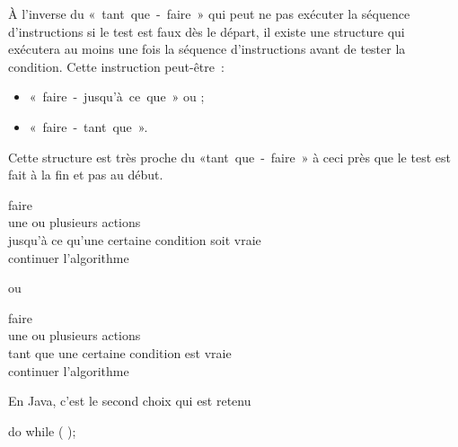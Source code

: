 	À l'inverse du «~tant~que~-~faire~» qui peut ne pas exécuter la séquence
	d'instructions si le test est faux dès le départ, il existe une structure
	qui exécutera au moins une fois la séquence d'instructions avant de tester
	la condition. Cette instruction peut-être~:

	\begin{itemize}
		\item «~faire~-~jusqu'à~ce~que~» ou ;
		\item «~faire~-~tant~que~».
	\end{itemize}
	
	Cette structure est très proche du «tant~que~-~faire~» à ceci près que le
	test est fait à la fin et pas au début.
 
	\begin{langagenaturel}
		faire\\
			\tab une ou plusieurs actions\\
		jusqu'à ce qu'une certaine condition soit vraie\\
		continuer l'algorithme 
	\end{langagenaturel}
	
	ou
	
	\begin{langagenaturel}
		faire\\
			\tab une ou plusieurs actions\\
		tant que une certaine condition est vraie\\
		continuer l'algorithme 
	\end{langagenaturel}
	
	En Java, c'est le second choix qui est retenu

	\begin{grammaire}
	    do 
	    while (  );
	\end{grammaire}


